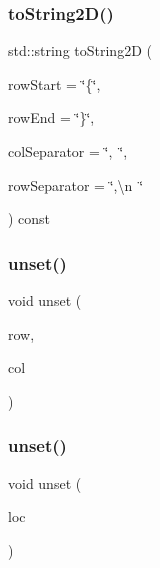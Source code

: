 \subsubsection{\texorpdfstring{to\+String2\+D()}{toString2D()}}
{\footnotesize\ttfamily std\+::string to\+String2D (\begin{DoxyParamCaption}\item[{std\+::string}]{row\+Start = {\ttfamily \char`\"{}\{\char`\"{}},  }\item[{std\+::string}]{row\+End = {\ttfamily \char`\"{}\}\char`\"{}},  }\item[{std\+::string}]{col\+Separator = {\ttfamily \char`\"{},~\char`\"{}},  }\item[{std\+::string}]{row\+Separator = {\ttfamily \char`\"{},\textbackslash{}n~\char`\"{}} }\end{DoxyParamCaption}) const}

\mbox{\label{classSparseGrid_ae8cd7ce6866d5bccb4d900047b00a9f0}} 
\subsubsection{\texorpdfstring{unset()}{unset()}\hspace{0.1cm}{\footnotesize\ttfamily [1/2]}}
{\footnotesize\ttfamily void unset (\begin{DoxyParamCaption}\item[{int}]{row,  }\item[{int}]{col }\end{DoxyParamCaption})}

\mbox{\label{classSparseGrid_a6c6a0cedc17fead9553340c164db6eb3}} 
\subsubsection{\texorpdfstring{unset()}{unset()}\hspace{0.1cm}{\footnotesize\ttfamily [2/2]}}
{\footnotesize\ttfamily void unset (\begin{DoxyParamCaption}\item[{const \mbox{\hyperlink{structGridLocation}{Grid\+Location}} \&}]{loc }\end{DoxyParamCaption})}

